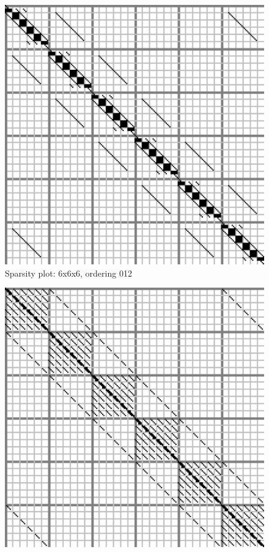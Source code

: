 \documentclass[10pt]{article}
\begin{document}
\begin{multicols}{2}
\begin{center}
\noindent
\begin{minipage}[t]{.5\textwidth}%
\begin{figure}[H]
    \centering
    \includegraphics[width=\spwidth]{../img/sparsity/int_small_6x6x6_012.eps}
    \caption{Sparsity plot: 6x6x6, ordering 012 }
\end{figure}
\vspace{\spmgin}
\begin{figure}[H]
    \centering
    \includegraphics[width=\spwidth]{../img/sparsity/int_small_6x6x6_021.eps}

\end{figure}
\end{minipage}
\end{center}
\end{multicols}
\end{document}
